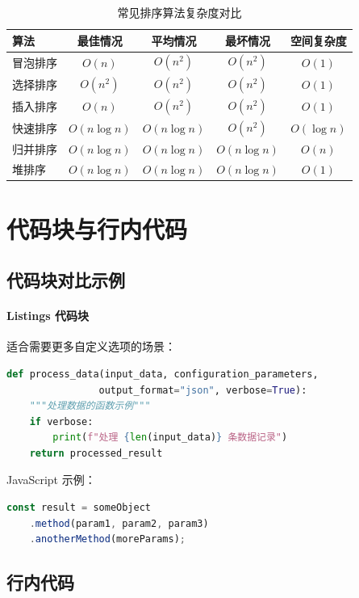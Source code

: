 \documentclass[../main]{subfiles}
\begin{document}
\begin{table}[H]
\centering
\caption{常见排序算法复杂度对比}
\label{tab:algorithm-complexity}
\begin{tabular}{@{}lcccc@{}}
\toprule
\textbf{算法} & \textbf{最佳情况} & \textbf{平均情况} & \textbf{最坏情况} & \textbf{空间复杂度} \\
\midrule
冒泡排序 & $O(n)$ & $O(n^2)$ & $O(n^2)$ & $O(1)$ \\
选择排序 & $O(n^2)$ & $O(n^2)$ & $O(n^2)$ & $O(1)$ \\
插入排序 & $O(n)$ & $O(n^2)$ & $O(n^2)$ & $O(1)$ \\
快速排序 & $O(n\log n)$ & $O(n\log n)$ & $O(n^2)$ & $O(\log n)$ \\
归并排序 & $O(n\log n)$ & $O(n\log n)$ & $O(n\log n)$ & $O(n)$ \\
堆排序 & $O(n\log n)$ & $O(n\log n)$ & $O(n\log n)$ & $O(1)$ \\
\bottomrule
\end{tabular}
\end{table}

\section{代码块与行内代码}

\subsection{代码块对比示例}

\paragraph{Listings 代码块}
适合需要更多自定义选项的场景：
\begin{lstlisting}[language=Python, caption=Python 函数示例]
def process_data(input_data, configuration_parameters,
                output_format="json", verbose=True):
    """处理数据的函数示例"""
    if verbose:
        print(f"处理 {len(input_data)} 条数据记录")
    return processed_result
\end{lstlisting}

JavaScript 示例：
\begin{lstlisting}[language=JavaScript, caption=JavaScript 链式调用示例]
const result = someObject
    .method(param1, param2, param3)
    .anotherMethod(moreParams);
\end{lstlisting}

\subsection{行内代码}
\end{document}

